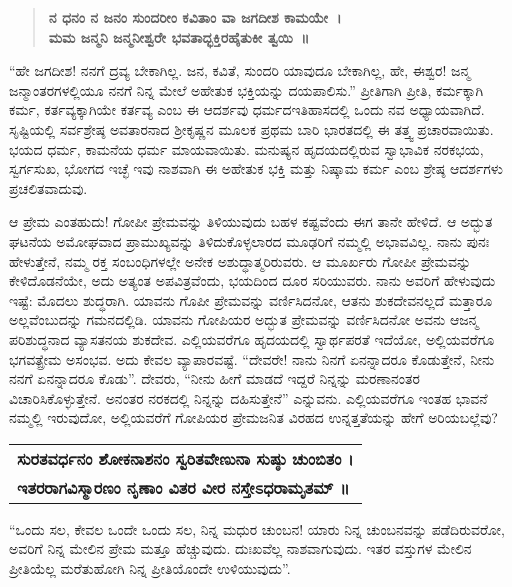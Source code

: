 \begin{verse}
\textbf{ನ ಧನಂ ನ ಜನಂ ಸುಂದರೀಂ ಕವಿತಾಂ ವಾ ಜಗದೀಶ ಕಾಮಯೇ~।}\\\textbf{ಮಮ ಜನ್ಮನಿ ಜನ್ಮನೀಶ್ವರೇ ಭವತಾದ್ಭಕ್ತಿರಹೈತುಕೀ ತ್ವಯಿ~॥}
\end{verse}

“ಹೇ ಜಗದೀಶ! ನನಗೆ ದ್ರವ್ಯ ಬೇಕಾಗಿಲ್ಲ. ಜನ, ಕವಿತೆ, ಸುಂದರಿ ಯಾವುದೂ ಬೇಕಾಗಿಲ್ಲ, ಹೇ, ಈಶ್ವರ! ಜನ್ಮ ಜನ್ಮಾಂತರಗಳಲ್ಲಿಯೂ ನನಗೆ ನಿನ್ನ ಮೇಲೆ ಅಹೇತುಕ ಭಕ್ತಿಯನ್ನು ದಯಪಾಲಿಸು.” ಪ್ರೀತಿಗಾಗಿ ಪ್ರೀತಿ, ಕರ್ಮಕ್ಕಾಗಿ ಕರ್ಮ, ಕರ್ತವ್ಯಕ್ಕಾಗಿಯೇ ಕರ್ತವ್ಯ ಎಂಬ ಈ ಆದರ್ಶವು ಧರ್ಮದ\break ಇತಿಹಾಸದಲ್ಲಿ ಒಂದು ನವ ಅಧ್ಯಾಯವಾಗಿದೆ. ಸೃಷ್ಟಿಯಲ್ಲಿ ಸರ್ವಶ್ರೇಷ್ಠ ಅವತಾರನಾದ ಶ‍್ರೀಕೃಷ್ಣನ ಮೂಲಕ ಪ್ರಥಮ ಬಾರಿ ಭಾರತದಲ್ಲಿ ಈ ತತ್ತ್ವ ಪ್ರಚಾರವಾಯಿತು. ಭಯದ ಧರ್ಮ, ಕಾಮನೆಯ ಧರ್ಮ ಮಾಯವಾಯಿತು. ಮನುಷ್ಯನ ಹೃದಯದಲ್ಲಿರುವ ಸ್ವಾಭಾವಿಕ ನರಕಭಯ, ಸ್ವರ್ಗಸುಖ, ಭೋಗದ ಇಚ್ಛೆ ಇವು ನಾಶವಾಗಿ ಈ ಅಹೇತುಕ ಭಕ್ತಿ ಮತ್ತು ನಿಷ್ಕಾಮ ಕರ್ಮ ಎಂಬ ಶ್ರೇಷ್ಠ ಆದರ್ಶಗಳು ಪ್ರಚಲಿತವಾದುವು.

ಆ ಪ್ರೇಮ ಎಂತಹುದು! ಗೋಪೀ ಪ್ರೇಮವನ್ನು ತಿಳಿಯುವುದು ಬಹಳ ಕಷ್ಟವೆಂದು ಈಗ ತಾನೇ ಹೇಳಿದೆ. ಆ ಅದ್ಭುತ ಘಟನೆಯ ಅಮೋಘವಾದ ಪ್ರಾಮುಖ್ಯವನ್ನು ತಿಳಿದುಕೊಳ್ಳಲಾರದ ಮೂಢರಿಗೆ ನಮ್ಮಲ್ಲಿ ಅಭಾವವಿಲ್ಲ. ನಾನು ಪುನಃ ಹೇಳುತ್ತೇನೆ, ನಮ್ಮ ರಕ್ತ ಸಂಬಂಧಿಗಳಲ್ಲೇ ಅನೇಕ ಅಶುದ್ಧಾತ್ಮರಿರುವರು. ಆ ಮೂರ್ಖರು ಗೋಪೀ ಪ್ರೇಮವನ್ನು ಕೇಳಿದೊಡನೆಯೇ, ಅದು ಅತ್ಯಂತ ಅಪವಿತ್ರವೆಂದು, ಭಯದಿಂದ ದೂರ ಸರಿಯುವರು. ನಾನು ಅವರಿಗೆ ಹೇಳುವುದು ಇಷ್ಟೆ: ಮೊದಲು ಶುದ್ಧರಾಗಿ. ಯಾವನು ಗೊಪೀ ಪ್ರೇಮವನ್ನು ವರ್ಣಿಸಿದನೋ, ಆತನು ಶುಕದೇವನಲ್ಲದೆ ಮತ್ತಾರೂ ಅಲ್ಲವೆಂಬುದನ್ನು ಗಮನದಲ್ಲಿಡಿ. ಯಾವನು ಗೋಪಿಯರ ಅದ್ಭುತ ಪ್ರೇಮವನ್ನು ವರ್ಣಿಸಿದನೋ ಅವನು ಆಜನ್ಮ ಪರಿಶುದ್ಧನಾದ ವ್ಯಾಸತನಯ ಶುಕದೇವ. ಎಲ್ಲಿಯವರೆಗೂ ಹೃದಯದಲ್ಲಿ ಸ್ವಾರ್ಥಪರತೆ ಇದೆಯೋ, ಅಲ್ಲಿಯವರೆಗೂ ಭಗವತ್ಪ್ರೇಮ ಅಸಂಭವ. ಅದು ಕೇವಲ ವ್ಯಾಪಾರವಷ್ಟೆ. “ದೇವರೇ! ನಾನು ನಿನಗೆ ಏನನ್ನಾದರೂ ಕೊಡುತ್ತೇನೆ, ನೀನು ನನಗೆ ಏನನ್ನಾದರೂ ಕೊಡು”. ದೇವರು, “ನೀನು ಹೀಗೆ ಮಾಡದೆ ಇದ್ದರೆ ನಿನ್ನನ್ನು ಮರಣಾನಂತರ ವಿಚಾರಿಸಿಕೊಳ್ಳುತ್ತೇನೆ. ಅನಂತರ ನರಕದಲ್ಲಿ ನಿನ್ನನ್ನು ದಹಿಸುತ್ತೇನೆ” ಎನ್ನುವನು. ಎಲ್ಲಿಯವರೆಗೂ ಇಂತಹ ಭಾವನೆ ನಮ್ಮಲ್ಲಿ ಇರುವುದೋ, ಅಲ್ಲಿಯವರೆಗೆ ಗೋಪಿಯರ ಪ್ರೇಮಜನಿತ ವಿರಹದ ಉನ್ನತ್ತತೆಯನ್ನು ಹೇಗೆ ಅರಿಯಬಲ್ಲೆವು?

\begin{longtable}{@{}l@{}}
\textbf{ಸುರತವರ್ಧನಂ ಶೋಕನಾಶನಂ ಸ್ವರಿತವೇಣುನಾ ಸುಷ್ಠು ಚುಂಬಿತಂ ।} \\
\textbf{ಇತರರಾಗವಿಸ್ಮಾರಣಂ ನೃಣಾಂ ವಿತರ ವೀರ ನಸ್ತೇಽಧರಾಮೃತಮ್​ ॥} \\
\end{longtable}

“ಒಂದು ಸಲ, ಕೇವಲ ಒಂದೇ ಒಂದು ಸಲ, ನಿನ್ನ ಮಧುರ ಚುಂಬನ! ಯಾರು ನಿನ್ನ ಚುಂಬನವನ್ನು ಪಡೆದಿರುವರೋ, ಅವರಿಗೆ ನಿನ್ನ ಮೇಲಿನ ಪ್ರೇಮ ಮತ್ತೂ ಹೆಚ್ಚುವುದು. ದುಃಖವೆಲ್ಲ ನಾಶವಾಗುವುದು. ಇತರ ವಸ್ತುಗಳ ಮೇಲಿನ ಪ್ರೀತಿಯೆಲ್ಲ ಮರೆತುಹೋಗಿ ನಿನ್ನ ಪ್ರೀತಿಯೊಂದೇ ಉಳಿಯುವುದು”.

